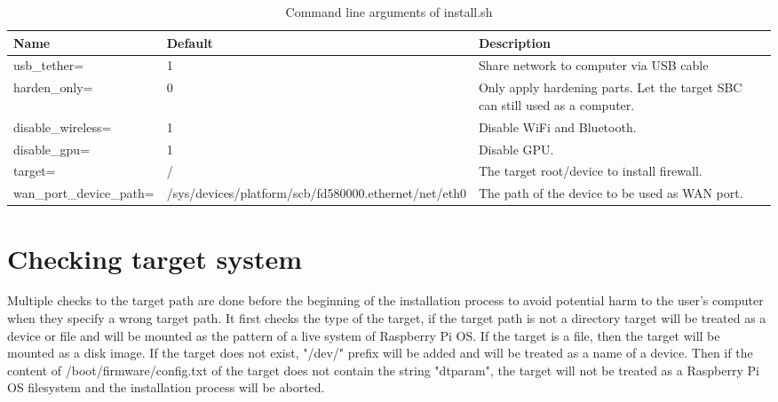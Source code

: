 \documentclass[mscthesis]{usiinfthesis}
\begin{document}
\begin{table}[H]
  \centering
  \begin{tabular}{|m{27mm}|m{30mm}|m{68mm}|}
    \hline
    Name                              & Default                                                                         & Description                                                                  \\
    \hline
    usb\_tether=                      & 1                                                                               & Share network to computer via USB cable                                      \\
    harden\_only=                     & 0                                                                               & Only apply hardening parts. Let the target SBC can still used as a computer. \\
    disable\_wireless=                & 1                                                                               & Disable WiFi and Bluetooth.                                                  \\
    disable\_gpu=                     & 1                                                                               & Disable GPU.                                                                 \\
    target=                           & /                                                                               & The target root/device to install firewall.                                  \\
    wan\_port\_\newline device\_path= & /sys/devices/\newline platform/scb/\newline fd580000.ethernet/\newline net/eth0 & The path of the device to be used as WAN port.                               \\
    \hline
  \end{tabular}
  \caption{Command line arguments of install.sh}
  \label{tab:install_arg}
\end{table}

\section{Checking target system}
Multiple checks to the target path are done before the beginning of the installation process to avoid potential harm to the user's computer when they specify a wrong target path. It first checks the type of the target, if the target path is not a directory target will be treated as a device or file and will be mounted as the pattern of a live system of Raspberry Pi OS. If the target is a file, then the target will be mounted as a disk image. If the target does not exist, "/dev/" prefix will be added and will be treated as a name of a device. Then if the content of /boot/firmware/config.txt of the target does not contain the string "dtparam", the target will not be treated as a Raspberry Pi OS filesystem and the installation process will be aborted.
\end{document}
